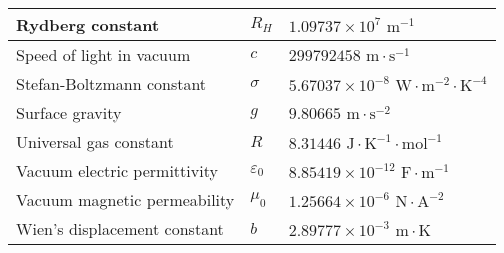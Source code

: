 \documentclass[../main.tex]{subfiles}
\begin{document}
\begin{center}
\begin{tabular}{|l|l|l|}
        \hline
        Rydberg constant                         & $R_H$                                 & $1.09737\times 10^7\text{ m}^{-1}$                                       \\
        \hline
        Speed of light in vacuum                 & $c$                                   & $299792458\text{ m}\cdot\text{s}^{-1}$                                   \\
        \hline
        Stefan-Boltzmann constant                & $\sigma$                              & $5.67037\times 10^{-8}\text{ W}\cdot\text{m}^{-2}\cdot\text{K}^{-4}$     \\
        \hline
        Surface gravity                          & $g$                                   & $9.80665\text{ m}\cdot\text{s}^{-2}$                                     \\
        \hline
        Universal gas constant                   & $R$                                   & $8.31446\text{ J}\cdot\text{K}^{-1}\cdot\text{mol}^{-1}$                 \\
        \hline
        Vacuum electric permittivity             & $\varepsilon_0$                       & $8.85419\times 10^{-12}\text{ F}\cdot\text{m}^{-1}$                      \\
        \hline
        Vacuum magnetic permeability             & $\mu_0$                               & $1.25664\times 10^{-6}\text{ N}\cdot\text{A}^{-2}$                       \\
        \hline
        Wien's displacement constant             & $b$                                   & $2.89777\times 10^{-3}\text{ m}\cdot\text{K}$                            \\
        \hline
    \end{tabular}
\end{center}
\end{document}
